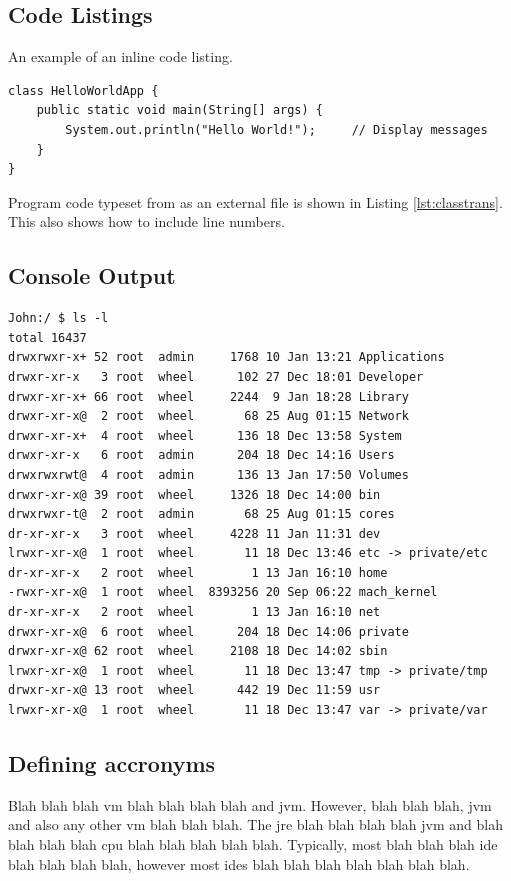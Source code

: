 \newpage
\subsection{Code Listings}
An example of an inline code listing.
\begin{lstlisting}[caption={Hello World in Java},label=lst:javahello]
class HelloWorldApp {
	public static void main(String[] args) {
		System.out.println("Hello World!");		// Display messages
	}
}
\end{lstlisting}

Program code typeset from as an external file is shown in Listing \ref{lst:classtrans}. This also shows how to include line numbers.



\newpage
\subsection{Console Output}

\begin{lstlisting}[style=console]
John:/ $ ls -l
total 16437
drwxrwxr-x+ 52 root  admin     1768 10 Jan 13:21 Applications
drwxr-xr-x   3 root  wheel      102 27 Dec 18:01 Developer
drwxr-xr-x+ 66 root  wheel     2244  9 Jan 18:28 Library
drwxr-xr-x@  2 root  wheel       68 25 Aug 01:15 Network
drwxr-xr-x+  4 root  wheel      136 18 Dec 13:58 System
drwxr-xr-x   6 root  admin      204 18 Dec 14:16 Users
drwxrwxrwt@  4 root  admin      136 13 Jan 17:50 Volumes
drwxr-xr-x@ 39 root  wheel     1326 18 Dec 14:00 bin
drwxrwxr-t@  2 root  admin       68 25 Aug 01:15 cores
dr-xr-xr-x   3 root  wheel     4228 11 Jan 11:31 dev
lrwxr-xr-x@  1 root  wheel       11 18 Dec 13:46 etc -> private/etc
dr-xr-xr-x   2 root  wheel        1 13 Jan 16:10 home
-rwxr-xr-x@  1 root  wheel  8393256 20 Sep 06:22 mach_kernel
dr-xr-xr-x   2 root  wheel        1 13 Jan 16:10 net
drwxr-xr-x@  6 root  wheel      204 18 Dec 14:06 private
drwxr-xr-x@ 62 root  wheel     2108 18 Dec 14:02 sbin
lrwxr-xr-x@  1 root  wheel       11 18 Dec 13:47 tmp -> private/tmp
drwxr-xr-x@ 13 root  wheel      442 19 Dec 11:59 usr
lrwxr-xr-x@  1 root  wheel       11 18 Dec 13:47 var -> private/var
\end{lstlisting}


\subsection{Defining accronyms}
Blah blah blah \gls{vm} blah  blah blah blah and \gls{jvm}. However, blah blah blah, \gls{jvm} and also any other \gls{vm} blah blah blah. The \gls{jre} blah blah blah blah \gls{jvm} and blah blah blah blah \gls{cpu} blah blah blah blah blah. Typically, most blah blah blah \gls{ide} blah blah blah blah, however most \glspl{ide} blah blah blah blah blah blah blah.




